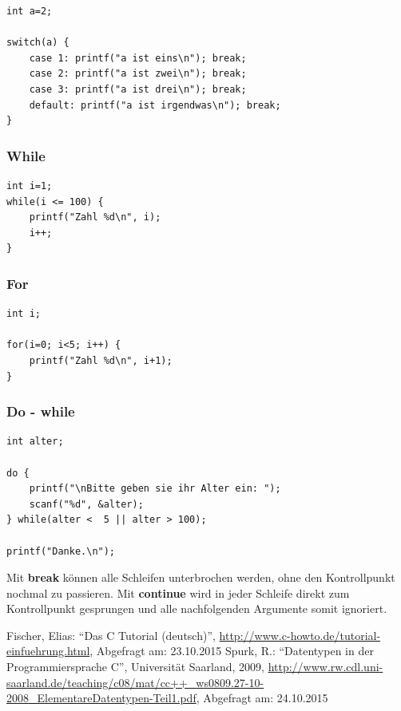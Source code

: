 \documentclass[11pt,a4paper,ngerman, fleqn]{article}
\let\qt\enquote
\let\noi\noindent
\let\tbf\textbf
\begin{document}
\begin{lstlisting}
int a=2;

switch(a) {
	case 1: printf("a ist eins\n"); break;
	case 2: printf("a ist zwei\n"); break;
	case 3: printf("a ist drei\n"); break;
	default: printf("a ist irgendwas\n"); break;
}
\end{lstlisting}

\subsubsection{While}

\begin{lstlisting}
int i=1;
while(i <= 100) {
	printf("Zahl %d\n", i);
	i++;
}
\end{lstlisting}

\subsubsection{For}

\begin{lstlisting}
int i;

for(i=0; i<5; i++) {
	printf("Zahl %d\n", i+1);
}
\end{lstlisting}

\subsubsection{Do - while}

\begin{lstlisting}
int alter;

do {
    printf("\nBitte geben sie ihr Alter ein: ");
    scanf("%d", &alter);
} while(alter <  5 || alter > 100);

printf("Danke.\n");
\end{lstlisting}

\noi Mit \tbf{break} können alle Schleifen unterbrochen werden, ohne den Kontrollpunkt nochmal zu passieren. Mit \tbf{continue} wird in jeder Schleife direkt zum Kontrollpunkt gesprungen und alle nachfolgenden Argumente somit ignoriert.


\newpage
\begin{RaggedRight}
\begin{thebibliography}{999}

 Fischer, Elias: \qt{Das C Tutorial (deutsch)}, \url{http://www.c-howto.de/tutorial-einfuehrung.html}, Abgefragt am: 23.10.2015
 Spurk, R.: \qt{Datentypen in der Programmiersprache C}, Universität Saarland, 2009, \url{http://www.rw.cdl.uni-saarland.de/teaching/c08/mat/cc++_ws0809.27-10-2008_ElementareDatentypen-Teil1.pdf}, Abgefragt am: 24.10.2015

\end{thebibliography}
\end{RaggedRight}
\end{document}

